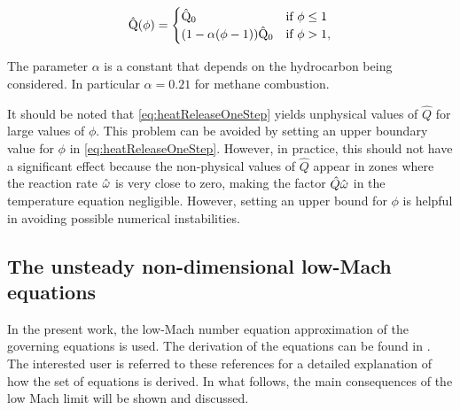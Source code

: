 \begin{equation}
	\hat{\mathrm{Q}}(\phi)=
	\begin{cases}
		\hat{\mathrm{Q}}_0                      & \text{if}~ \phi \leq 1 \\
		(1 - \alpha(\phi -1))\hat{\mathrm{Q}}_0 & \text{if}~\phi > 1,
	\end{cases}  \label{eq:heatReleaseOneStep}
\end{equation}

The parameter $\alpha$ is a constant that depends on the hydrocarbon being considered. In particular $\alpha = 0.21$ for methane combustion.


It should be noted that \cref{eq:heatReleaseOneStep} yields unphysical values of $\hat Q$ for large values of $\phi$. This problem can be avoided by setting an upper boundary value for $\phi$ in \cref{eq:heatReleaseOneStep}. However, in practice, this should not have a significant effect because the non-physical values of $\hat Q$ appear in zones where the reaction rate $\hat{\omega}$ is very close to zero, making the factor $\hat Q \hat{\omega}$ in the temperature equation negligible. However, setting an upper bound for $\phi$ is helpful in avoiding possible numerical instabilities.

\subsection{The unsteady non-dimensional low-Mach equations} \label{ssec:NonDimLowMachEquations}

In the present work, the low-Mach number equation approximation of the governing equations is used. The derivation of the equations can be found in \citep{rehmEquationsMotionThermally1978, majdaDerivationNumericalSolution1985,mullerLowMachNumberAsymptoticsNavierStokes1998}. The interested user is referred to these references for a detailed explanation of how the set of equations is derived. In what follows, the main consequences of the low Mach limit will be shown and discussed.

